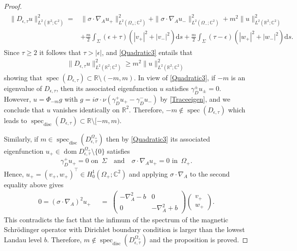 \documentclass[10pt,a4paper]{amsart}
\def \cc {{\mathbb C}}
\DeclareMathOperator{\dom}{dom}
\def \rr {{\mathbb R}}
\DeclareMathOperator{\spec}{spec}
\newcommand{\specd}{\spec_\mathrm{disc}}
\begin{document}
\begin{proof}
 \begin{align}\label{Quadratic3}
 \begin{split}
 \|D_{\epsilon,\tau}u \|^2_{L^2(\rr^2;\cc^2)} =&  \|\sigma\cdot\nabla_A u_+ \|^2_{L^2(\Omega_+;\cc^2)} + \|\sigma\cdot\nabla_A u_- \|^2_{L^2(\Omega_-;\cc^2)} + m^2 \|u \|^2_{L^2(\rr^2;\cc^2)} \\
 &+ \frac{m}{2} \int_\Sigma (\epsilon+\tau)(|v_+ |^2 + |v_- |^2) \mathrm{d} s   + \frac{m}{2} \int_\Sigma (\tau-\epsilon)( |w_+ |^2 + |w_- |^2)\mathrm{d}s.
 \end{split}
 \end{align}
Since $\tau \geq2$ it follows that $\tau>|\epsilon|$, and  \eqref{Quadratic3} entails that
 \begin{align*}
 \|D_{\epsilon,\tau}u \|^2_{L^2(\rr^2;\cc^2)} \geq m^2 \|u \|^2_{L^2(\rr^2;\cc^2)}
 \end{align*}
 showing that $\spec(D_{\epsilon,\tau})\subset \rr\setminus (-m,m)$. In view of \eqref{Quadratic3}, if $-m$ is an eigenvalue of $D_{\epsilon,\tau}$, then its associated eigenfunction $u$ satisfies $\gamma_D^\pm u_\pm=0$. However, $u=\Phi_{-m} g$ with $g=i\sigma\cdot\nu(\gamma_D^+ u_+-\gamma_D^- u_-)$ by \eqref{Traceeigen}, and we conclude that $u$ vanishes identically on $\rr^2$. Therefore, $-m\notin\spec(D_{\epsilon,\tau})$ which leads to $\specd(D_{\epsilon,\tau})\subset \rr\setminus [-m,m)$.  

Similarly, if  $m\in \specd (D_{\epsilon,\tau}^{\Omega_+})$ then by  \eqref{Quadratic3} its associated eigenfunction $u_+\in \dom D_{\epsilon,\tau}^{\Omega_+}\setminus\{0\}$ satisfies 
\begin{align*}
\gamma_D^+ u_+=0 \,\,\text{on }\,\Sigma \quad\text{and}\quad \sigma\cdot\nabla_A u_+=0 \,\,\text{in }\,\Omega_+.
\end{align*}
Hence, $u_+ =(v_+,w_+)^\top\in H^1_0(\Omega_+;\cc^2)$ and applying $\sigma\cdot\nabla_A$ to the second equality above gives
\begin{align*}
0=(\sigma\cdot\nabla_A)^2 u_+\;\;
&=\; \begin{pmatrix} -\nabla_A^2 - b & 0 \\ 0 & -\nabla_A^2 + b \end{pmatrix}\begin{pmatrix} v_+\\
  w_+
 \end{pmatrix}.
\end{align*}
This contradicts the fact that the infimum of the spectrum of the magnetic Schr\"odinger operator with Dirichlet boundary condition is larger than the lowest Landau level $b$. Therefore,  $m\notin \specd (D_{\epsilon,\tau}^{\Omega_+})$ and the proposition is proved.
\end{proof}
\end{document}
